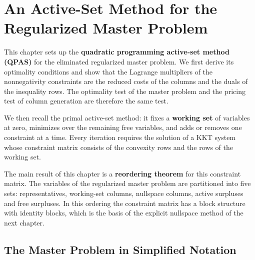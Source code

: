 \chapter{An Active-Set Method for the Regularized Master Problem}
\label{chap:qpas}

\vspace*{\fill}

This chapter sets up the \textbf{quadratic programming active-set method (QPAS)} for the
eliminated regularized master problem. We first derive its optimality conditions and show
that the Lagrange multipliers of the nonnegativity constraints are the reduced costs of the
columns and the duals of the inequality rows. The optimality test of the master problem and
the pricing test of column generation are therefore the same test.

\medskip

We then recall the primal active-set method: it fixes a \textbf{working set} of variables at
zero, minimizes over the remaining free variables, and adds or removes one constraint at a
time. Every iteration requires the solution of a KKT system whose constraint matrix consists
of the convexity rows and the rows of the working set.

\medskip

The main result of this chapter is a \textbf{reordering theorem} for this constraint matrix.
The variables of the regularized master problem are partitioned into five sets:
representatives, working-set columns, nullspace columns, active surpluses and free surpluses.
In this ordering the constraint matrix has a block structure with identity blocks, which
is the basis of the explicit nullspace method of the next chapter.

\vspace*{\fill}

\newpage


\section{The Master Problem in Simplified Notation}
\label{sec:simplified}

